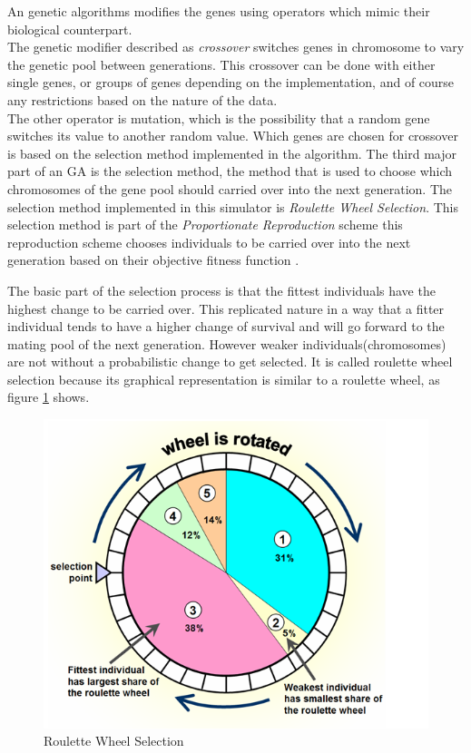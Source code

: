An genetic algorithms modifies the genes using operators which mimic their biological counterpart. \\

The genetic modifier described as \textit{crossover} switches genes in chromosome to vary the genetic pool between generations. 
This crossover can be done with either single genes, or groups of genes depending on the implementation, and of course any restrictions based on the nature of the data. \\

The other operator is mutation, which is the possibility that a random gene switches its value to another random value.
Which genes are chosen for crossover is based on the selection method implemented in the algorithm. 
The third major part of an GA is the selection method, the method that is used to choose which chromosomes of the gene pool should carried over into the next generation.
The selection method implemented in this simulator is \textit{Roulette Wheel Selection}. 
This selection method is part of the \textit{Proportionate Reproduction} scheme this reproduction scheme chooses individuals to be carried over into the next generation based on their objective fitness function \cite{goldberg1991comparative}. 

The basic part of the selection process is that the fittest individuals have the highest change to be carried over. This replicated nature in a way that a fitter individual tends to have a higher change of survival and will go forward to the mating pool of the next generation.
However weaker individuals(chromosomes) are not without a probabilistic change to get selected. 
It is called roulette wheel selection because its graphical representation is similar to a roulette wheel, as figure \ref{fig:selection} shows\cite{1631619}.

\begin{figure}[h]
\begin{center}
\includegraphics[scale=0.4]{Chapter1/images/roulette_wheel.png} 
\caption[Roulette Wheel Selection]{Roulette Wheel Selection\footnotemark}
\label{fig:selection}
\end{center}
\end{figure} 

